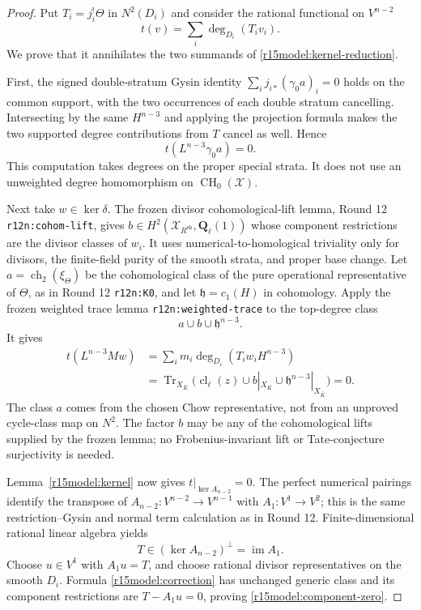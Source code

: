 \begin{proof}
Put $T_i=j_i^!\Theta$ in $N^2(D_i)$ and consider the rational
functional on $V^{n-2}$
\[
                    t(v)=\sum_i\deg_{D_i}(T_i v_i).
\]
We prove that it annihilates the two summands of
\eqref{r15model:kernel-reduction}.

First, the signed double-stratum Gysin identity
$\sum_i j_{i*}(\gamma_0 a)_i=0$ holds on the common support,
with the two occurrences of each double stratum cancelling.
Intersecting by the same $H^{n-3}$ and applying the projection
formula makes the two supported degree contributions from $T$
cancel as well.  Hence
\[
                         t(L^{n-3}\gamma_0a)=0.
\]
This computation takes degrees on the proper special strata.
It does not use an unweighted degree homomorphism on
$\operatorname{CH}_0(\mathcal X)$.

Next take $w\in\ker\delta$.  The frozen divisor cohomological-lift
lemma, Round 12 \texttt{r12n:cohom-lift}, gives
$b\in H^2(\mathcal X_{R^{\mathrm{sh}}},\mathbf Q_\ell(1))$
whose component restrictions are the divisor classes of $w_i$.
It uses numerical-to-homological triviality only for divisors,
the finite-field purity of the smooth strata, and proper base
change.  Let $a=\operatorname{ch}_2(\xi_\Theta)$ be the
cohomological class of the pure operational representative of
$\Theta$, as in Round 12 \texttt{r12n:K0}, and let
$\mathfrak h=c_1(H)$ in cohomology.  Apply the frozen weighted
trace lemma \texttt{r12n:weighted-trace} to the top-degree class
\[
                           a\cup b\cup\mathfrak h^{n-3}.
\]
It gives
\[
 \begin{split}
 t(L^{n-3}Mw)
 &=\sum_i m_i\deg_{D_i}(T_i w_i H^{n-3})\\
 &=\operatorname{Tr}_{X_{\bar K}}
       \bigl(\operatorname{cl}_\ell(z)\cup b|_{X_{\bar K}}
                                    \cup\mathfrak h^{n-3}|_{X_{\bar K}}\bigr)
 =0.
 \end{split}
\tag{LW15.9}\label{r15model:weighted-annihilation}
\]
The class $a$ comes from the chosen Chow representative, not from
an unproved cycle-class map on $N^2$.  The factor $b$ may be any
of the cohomological lifts supplied by the frozen lemma; no
Frobenius-invariant lift or Tate-conjecture surjectivity is needed.

Lemma~\ref{r15model:kernel} now gives $t|_{\ker A_{n-2}}=0$.
The perfect numerical pairings identify the transpose of
$A_{n-2}:V^{n-2}\to V^{n-1}$ with
$A_1:V^1\to V^2$; this is the same restriction--Gysin and normal
term calculation as in Round 12.  Finite-dimensional rational
linear algebra yields
\[
                         T\in(\ker A_{n-2})^\perp
                                          =\operatorname{im}A_1.
\]
Choose $u\in V^1$ with $A_1u=T$, and choose rational divisor
representatives on the smooth $D_i$.  Formula
\eqref{r15model:correction} has unchanged generic class and its
component restrictions are $T-A_1u=0$, proving
\eqref{r15model:component-zero}.


\end{proof}
